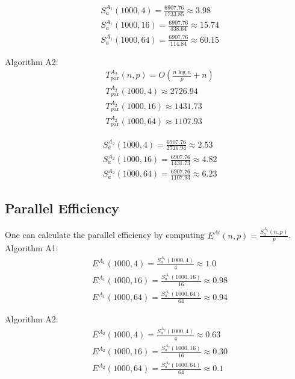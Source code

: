 \documentclass[a4paper,%
11pt,%
DIV12,
headsepline,%
headings=normal,
]{scrartcl}
\begin{document}
\begin{align*}
    &S_{a}^{A_1} (1000, 4) = \frac{6907.76}{1733.85} \approx 3.98\\
    &S_{a}^{A_1} (1000, 16) = \frac{6907.76}{438.64} \approx 15.74\\
    &S_{a}^{A_1}(1000, 64) = \frac{6907.76}{114.84} \approx 60.15
\end{align*}

Algorithm A2:
\begin{align*}
    &T^{A_2}_{\text{par}}(n, p) = O\left(\frac{n \log n}{p} + n\right) \\
    &T^{A_2}_{\text{par}}(1000, 4) \approx 2726.94 \\
    &T^{A_2}_{\text{par}}(1000, 16) \approx 1431.73 \\
    &T^{A_2}_{\text{par}}(1000, 64) \approx 1107.93
\end{align*}

\begin{align*}
    &S_{a}^{A_2} (1000, 4) = \frac{6907.76}{2726.94} \approx 2.53\\
    &S_{a}^{A_2} (1000, 16) = \frac{6907.76}{1431.73} \approx 4.82\\
    &S_{a}^{A_2} (1000, 64) = \frac{6907.76}{1107.93} \approx 6.23
\end{align*}

\subsection{Parallel Efficiency}

One can calculate the parallel efficiency by computing $E^{Ai} (n, p) = \frac{S_{a}^{A_i} (n, p)}{p} $. \\

Algorithm A1:
\begin{align*}
    &E^{A_1}(1000, 4) = \frac{S_{a}^{A_1} (1000, 4)}{4} \approx 1.0 \\
    &E^{A_1}(1000, 16) = \frac{S_{a}^{A_1} (1000, 16)}{16} \approx 0.98 \\
    &E^{A_1}(1000, 64) = \frac{S_{a}^{A_1}(1000, 64)}{64} \approx 0.94
\end{align*}

Algorithm A2:
\begin{align*}
    &E^{A_2} (1000, 4) = \frac{S_{a}^{A_2} (1000, 4)}{4} \approx 0.63 \\
    &E^{A_2} (1000, 16) = \frac{S_{a}^{A_2} (1000, 16)}{16} \approx 0.30 \\
    &E^{A_2} (1000, 64) = \frac{S_{a}^{A_2} (1000, 64)}{64} \approx 0.1
\end{align*}
\end{document}
